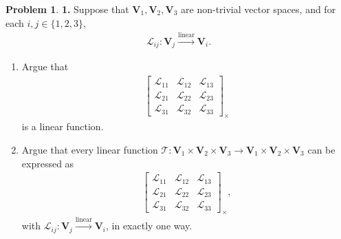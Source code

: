 \documentclass{book}
\theoremstyle{definition}
\newtheorem*{prob*}{Problem}
\newcommand{\V}{\mathbf{V}}
\newcommand{\lag}{\mathcal{L}}
\newcommand{\T}{\mathcal{T}}
\begin{document}
\begin{prob*}\textbf{1.} Suppose that $\V_1, \V_2, \V_3$ are non-trivial vector spaces, and for each $i,j \in \{ 1,2,3\}$,
	\begin{align*}
	\lag_{ij} : \V_j \overset{\text{linear}}{\longrightarrow} \V_i.
	\end{align*}
	\begin{enumerate}
		\item Argue that 
		\begin{align*}
		\begin{bmatrix}
		\lag_{11} & \lag_{12} & \lag_{13}\\
		\lag_{21} & \lag_{22} & \lag_{23}\\
		\lag_{31} & \lag_{32} & \lag_{33}
		\end{bmatrix}_\times
		\end{align*}
		is a linear function.\\
		
		
		
		
		
		
		
		
		
		

		
		\item Argue that every linear function $\T : \V_1 \times \V_2 \times \V_3 \to \V_1\times\V_2\times \V_3$ can be expressed as 
		\begin{align*} 
		\begin{bmatrix}
		\lag_{11} & \lag_{12} & \lag_{13}\\
		\lag_{21} & \lag_{22} & \lag_{23}\\
		\lag_{31} & \lag_{32} & \lag_{33} 
		\end{bmatrix}_\times,
		\end{align*} 
		with $\lag_{ij} : \V_j \overset{\text{linear}}{\longrightarrow} \V_i$, in exactly one way. \\
		

\end{enumerate}
\end{prob*}
\end{document}

